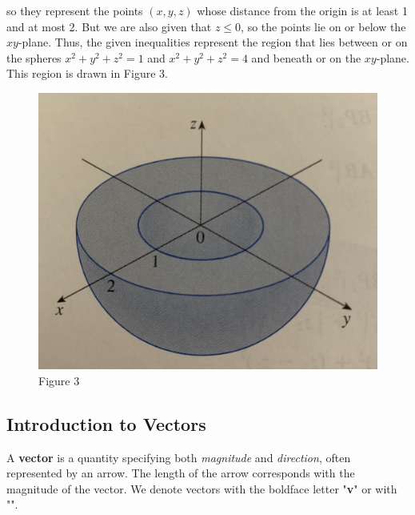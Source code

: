\documentclass{article}
\begin{document}
            \noindent so they represent the points $(x,y,z)$ whose distance from the origin is at least 1 and
            at most 2. But we are also given that $z\leq0$, so the points lie on or below the
            $xy$-plane. Thus, the given inequalities represent the region that lies between or on
            the spheres $x^2+y^2+z^2=1$ and $x^2+y^2+z^2=4$ and beneath or on the $xy$-plane.
            This region is drawn in Figure 3.

            \begin{figure}[h]
                \centering
                \includegraphics[scale=0.1]{Resources/Unit3Vectors/Fig3.jpg}
                \caption*{Figure 3}
            \end{figure}


        \subsection{Introduction to Vectors}
            A \textbf{vector} is a quantity specifying both \emph{magnitude} and \emph{direction},
            often represented by an arrow. The length of the arrow corresponds with the magnitude
            of the vector. We denote vectors with the boldface letter "\textbf{v}" or with
            "". \\
\end{document}
